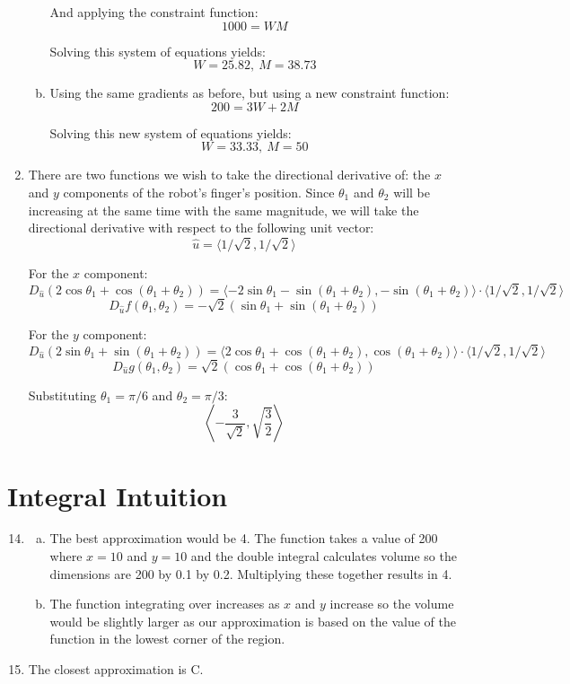 \documentclass{article}
\begin{document}
\begin{enumerate}[1.]
\begin{enumerate}[a.]
        And applying the constraint function:
        $$ 1000 = W M $$

        Solving this system of equations yields:
        $$ W = 25.82,\ M = 38.73 $$
      \item Using the same gradients as before, but using a new constraint
        function:
        $$ 200 = 3W + 2M $$

        Solving this new system of equations yields:
        $$ W = 33.33,\ M = 50 $$
    \end{enumerate}
  \item There are two functions we wish to take the directional derivative of:
    the $x$ and $y$ components of the robot's finger's position. Since
    $\theta_{1}$ and $\theta_2$ will be increasing at the same time with the
    same magnitude, we will take the directional derivative with respect to the
    following unit vector:
    $$ \hat{u} = \langle 1/\sqrt{2}, 1/\sqrt{2} \rangle $$

    For the $x$ component:
    $$ D_{\hat{u}}(2 \cos \theta_{1} + \cos (\theta_{1}+\theta_{2})) = \langle
    -2 \sin \theta_1 - \sin (\theta_1 + \theta_2), -\sin (\theta_1 + \theta_2)
    \rangle \cdot \langle 1/\sqrt{2}, 1/\sqrt{2} \rangle $$
    $$ D_{\hat{u}}f(\theta_1, \theta_{2}) = -\sqrt{2} \left( \sin \theta_1 +
    \sin (\theta_1 + \theta_{2}) \right) $$

    For the $y$ component:
    $$ D_{\hat{u}}(2 \sin \theta_{1} + \sin (\theta_1 + \theta_{2})) = \langle 2
    \cos \theta_1 + \cos (\theta_1 + \theta_{2}), \cos (\theta_1 + \theta_2)
    \rangle \cdot \langle 1/\sqrt{2}, 1/\sqrt{2} \rangle $$
    $$ D_{\hat{u}}g(\theta_1, \theta_{2}) = \sqrt{2} ( \cos \theta_1 + \cos
    (\theta_1 + \theta_{2}) ) $$

    Substituting $\theta_1 = \pi/6$ and $\theta_2 = \pi/3$:
    $$ \left\langle -\frac{ 3 }{ \sqrt{2} }, \sqrt{\frac{ 3 }{ 2 }}
      \right\rangle $$

\end{enumerate}

\section{Integral Intuition}

\begin{enumerate}[1.]
  \setcounter{enumi}{13}
  \item \begin{enumerate}[a.]
      \item The best approximation would be 4. The function takes a value of 200
        where $x = 10$ and $y = 10$ and the double integral calculates volume so
        the dimensions are 200 by 0.1 by 0.2. Multiplying these together results
        in 4.
      \item The function integrating over increases as $x$ and $y$ increase so
        the volume would be slightly larger as our approximation is based on the
        value of the function in the lowest corner of the region.
    \end{enumerate}
  \item The closest approximation is C.
\end{enumerate}
\end{document}
